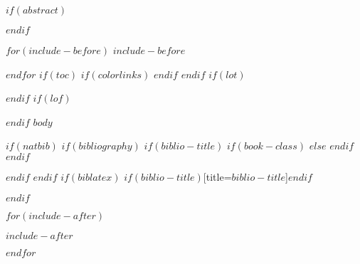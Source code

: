 \documentclass[fontsize=12pt]{scrartcl}
\newif\IfInSansMode
\begin{document}

\thispagestyle{empty}
\tableofcontents
\newpage


$if(abstract)$
\begin{abstract}
$abstract$
\end{abstract}
$endif$

$for(include-before)$
$include-before$

$endfor$
$if(toc)$
{
$if(colorlinks)$
\hypersetup{linkcolor=$if(toccolor)$$toccolor$$else$black$endif$}
$endif$
\setcounter{tocdepth}{$toc-depth$}
\tableofcontents
}
$endif$
$if(lot)$
\listoftables
$endif$
$if(lof)$
\listoffigures
$endif$
$body$

$if(natbib)$
$if(bibliography)$
$if(biblio-title)$
$if(book-class)$
\renewcommand\bibname{$biblio-title$}
$else$
\renewcommand\refname{$biblio-title$}
$endif$
$endif$


$endif$
$endif$
$if(biblatex)$
\printbibliography$if(biblio-title)$[title=$biblio-title$]$endif$

$endif$


$for(include-after)$

$include-after$

$endfor$
\end{document}

